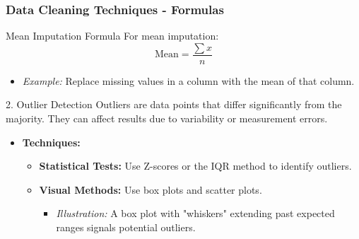 \documentclass[aspectratio=169]{beamer}
\begin{document}
\begin{frame}[fragile]
    \frametitle{Data Cleaning Techniques - Formulas}
    \begin{block}{Mean Imputation Formula}
        For mean imputation:
        \begin{equation}
            \text{Mean} = \frac{\sum{x}}{n}
        \end{equation}
        \begin{itemize}
            \item \textit{Example:} Replace missing values in a column with the mean of that column.
        \end{itemize}
    \end{block}

\begin{block}{2. Outlier Detection}
    Outliers are data points that differ significantly from the majority. They can affect results due to variability or measurement errors.
    \begin{itemize}
        \item \textbf{Techniques:}
            \begin{itemize}
                \item \textbf{Statistical Tests:} Use Z-scores or the IQR method to identify outliers.
                \item \textbf{Visual Methods:} Use box plots and scatter plots.
                    \begin{itemize}
                        \item \textit{Illustration:} A box plot with "whiskers" extending past expected ranges signals potential outliers.
                    \end{itemize}
            \end{itemize}
    \end{itemize}
\end{block}
\end{frame}
\end{document}
